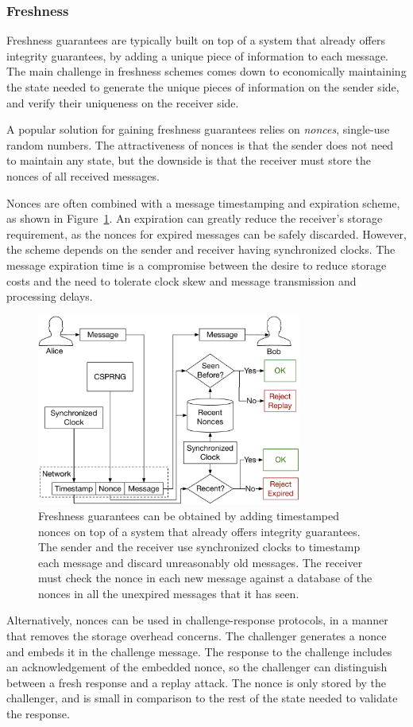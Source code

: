 \subsubsection{Freshness}
\label{sec:freshness_crypto}

Freshness guarantees are typically built on top of a system that already offers
integrity guarantees, by adding a unique piece of information to each message.
The main challenge in freshness schemes comes down to economically maintaining
the state needed to generate the unique pieces of information on the sender
side, and verify their uniqueness on the receiver side.

A popular solution for gaining freshness guarantees relies on \textit{nonces},
single-use random numbers. The attractiveness of nonces is that the sender does
not need to maintain any state, but the downside is that the receiver must
store the nonces of all received messages.

Nonces are often combined with a message timestamping and expiration scheme, as
shown in Figure~\ref{fig:timestamped_nonces}. An expiration can greatly reduce
the receiver's storage requirement, as the nonces for expired messages can be
safely discarded. However, the scheme depends on the sender and receiver having
synchronized clocks. The message expiration time is a compromise between the
desire to reduce storage costs and the need to tolerate clock skew and
message transmission and processing delays.

\begin{figure}[hbt]
  \centering
  \includegraphics[width=87mm]{figures/timestamped_nonces.pdf}
  \caption{
    Freshness guarantees can be obtained by adding timestamped nonces on top
    of a system that already offers integrity guarantees. The sender and the
    receiver use synchronized clocks to timestamp each message and discard
    unreasonably old messages. The receiver must check the nonce in each new
    message against a database of the nonces in all the unexpired messages that
    it has seen.
  }
  \label{fig:timestamped_nonces}
\end{figure}

Alternatively, nonces can be used in challenge-response protocols, in a manner
that removes the storage overhead concerns. The challenger generates a nonce
and embeds it in the challenge message. The response to the challenge includes
an acknowledgement of the embedded nonce, so the challenger can distinguish
between a fresh response and a replay attack. The nonce is only stored by the
challenger, and is small in comparison to the rest of the state needed to
validate the response.
